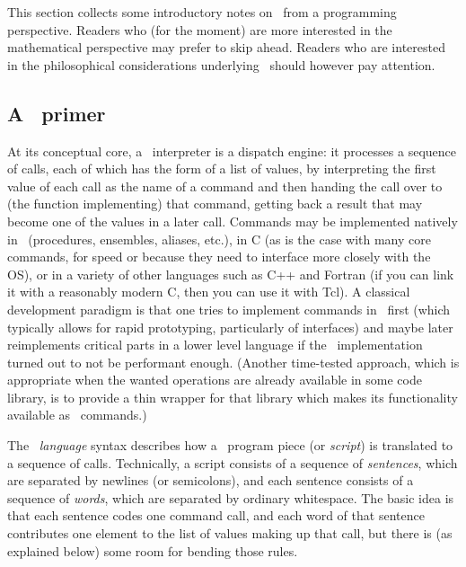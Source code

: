 \documentclass{mtmtcl}
\theoremstyle{plain}
\theoremstyle{remark}
\begin{document}
This section collects some introductory notes on \mtl\ from a 
programming perspective. Readers who (for the moment) are more 
interested in the mathematical perspective may prefer to skip ahead. 
Readers who are interested in the philosophical considerations 
underlying \mtl\ should however pay attention.


\subsection{A \Tcl\ primer}

At its conceptual core, a \Tcl\ interpreter is a dispatch engine: it 
processes a sequence of calls, each of which has the form of a list of 
values, by interpreting the first value of each call as the name of a 
command and then handing the call over to (the function implementing) 
that command, getting back a result that may become one of the values 
in a later call. Commands may be implemented natively in \Tcl\ 
(procedures, ensembles, aliases, etc.), in C (as is the case with many 
core commands, for speed or because they need to interface more 
closely with the OS), or in a variety of other languages such as C++ 
and Fortran (if you can link it with a reasonably modern C, then you can 
use it with Tcl). A classical development paradigm is that one 
tries to implement commands in \Tcl\ first (which typically allows for 
rapid prototyping, particularly of interfaces) and maybe later 
reimplements critical parts in a lower level language if the \Tcl\ 
implementation turned out to not be performant enough. (Another 
time-tested approach, which is appropriate when the wanted operations 
are already available in some code library, is to provide a thin 
wrapper for that library which makes its functionality available as 
\Tcl\ commands.)

The \Tcl\ \emph{language} syntax describes how a \Tcl\ program piece 
(or \emph{script}) is translated to a sequence of calls. Technically, a 
script consists of a sequence of \emph{sentences}, which are 
separated by newlines (or semicolons), and each sentence consists of 
a sequence of \emph{words}, which are separated by ordinary 
whitespace. The basic idea is that each sentence codes one command 
call, and each word of that sentence contributes one element to the 
list of values making up that call, but there is (as explained below) 
some room for bending those rules.
\end{document}
